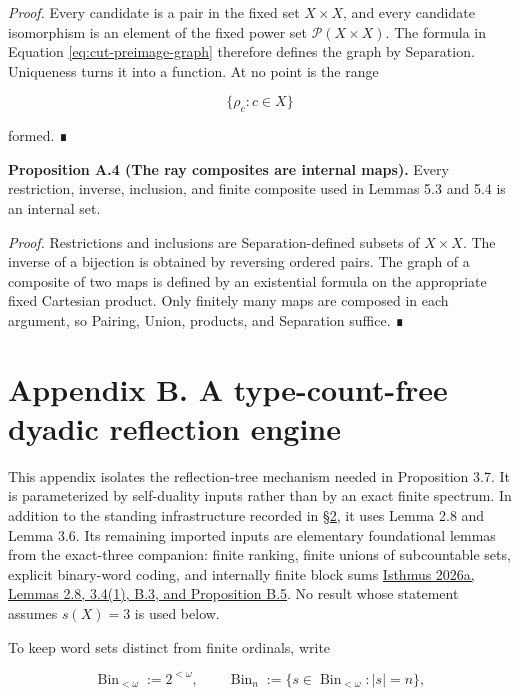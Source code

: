 \documentclass[
  english,
  11pt,
  reqno]{amsart}
\begin{document}
\emph{Proof.} Every candidate is a pair in the fixed set \(X\times X\),
and every candidate isomorphism is an element of the fixed power set
\(\mathcal P(X\times X)\). The formula in Equation
\hyperref[eq:cut-preimage-graph]{\eqref{eq:cut-preimage-graph}}
therefore defines the graph by Separation. Uniqueness turns it into a
function. At no point is the range

\[
\{\rho_c:c\in X\}
\]

formed. ∎

\protect{}\label{prop:a-4-composites}

\textbf{Proposition A.4 (The ray composites are internal maps).} Every
restriction, inverse, inclusion, and finite composite used in Lemmas 5.3
and 5.4 is an internal set.

\emph{Proof.} Restrictions and inclusions are Separation-defined subsets
of \(X\times X\). The inverse of a bijection is obtained by reversing
ordered pairs. The graph of a composite of two maps is defined by an
existential formula on the appropriate fixed Cartesian product. Only
finitely many maps are composed in each argument, so Pairing, Union,
products, and Separation suffice. ∎

\protect{}\label{app:dyadic-engine}

\section{Appendix B. A type-count-free dyadic reflection
engine}\label{appendix-b.-a-type-count-free-dyadic-reflection-engine}

This appendix isolates the reflection-tree mechanism needed in
Proposition 3.7. It is parameterized by self-duality inputs rather than
by an exact finite spectrum. In addition to the standing infrastructure
recorded in \hyperref[sec:formal-setting]{§2}, it uses Lemma 2.8 and
Lemma 3.6. Its remaining imported inputs are elementary foundational
lemmas from the exact-three companion: finite ranking, finite unions of
subcountable sets, explicit binary-word coding, and internally finite
block sums \hyperref[ref:isthmus2026a]{Isthmus 2026a, Lemmas 2.8,
3.4(1), B.3, and Proposition B.5}. No result whose statement assumes
\(s(X)=3\) is used below.

To keep word sets distinct from finite ordinals, write

\[
\operatorname{Bin}_{<\omega}
:=
2^{<\omega},
\qquad
\operatorname{Bin}_n
:=
\{s\in\operatorname{Bin}_{<\omega}:|s|=n\},
\]
\end{document}
